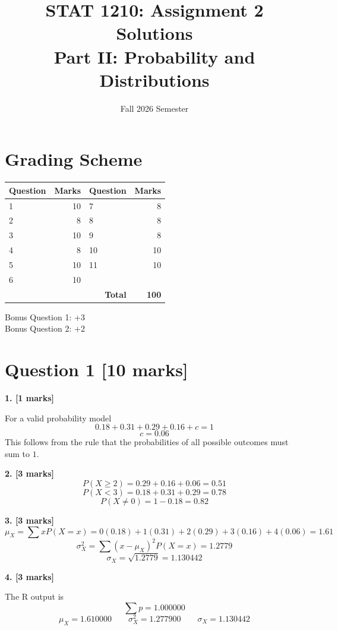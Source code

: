 \documentclass[10pt,letterpaper]{article}
\title{STAT 1210: Assignment 2 Solutions\\[4pt]\large Part II: Probability and Distributions}
\author{Fall 2026 Semester}
\date{}
\begin{document}
\maketitle

\section*{Grading Scheme}

\begin{center}
\begin{tabular}{lr@{\qquad}lr}
\toprule
Question & Marks & Question & Marks\\
\midrule
1 & 10 & 7 & 8\\
2 & 8 & 8 & 8\\
3 & 10 & 9 & 8\\
4 & 8 & 10 & 10\\
5 & 10 & 11 & 10\\
6 & 10 & &\\
\midrule
\multicolumn{3}{r}{\textbf{Total}} & \textbf{100}\\
\bottomrule
\end{tabular}
\end{center}

Bonus Question 1: +3 \\
Bonus Question 2: +2

\newpage

\section*{Question 1 \hfill [10 marks]}

\textbf{1. [1 marks]}

For a valid probability model
$$0.18+0.31+0.29+0.16+c=1$$
$$\boxed{c=0.06}$$
This follows from the rule that the probabilities of all possible outcomes must sum to \(1\).

\textbf{2. [3 marks]}
$$P(X\ge2)=0.29+0.16+0.06=\boxed{0.51}$$
$$P(X<3)=0.18+0.31+0.29=\boxed{0.78}$$
$$P(X\ne0)=1-0.18=\boxed{0.82}$$

\textbf{3. [3 marks]}
$$\mu_X=\sum xP(X=x)=0(0.18)+1(0.31)+2(0.29)+3(0.16)+4(0.06)=\boxed{1.61}$$
$$\sigma_X^2=\sum (x-\mu_X)^2P(X=x)=\boxed{1.2779}$$
$$\sigma_X=\sqrt{1.2779}=\boxed{1.130442}$$

\textbf{4. [3 marks]}

The R output is
$$\boxed{\sum p=1.000000}$$
$$\boxed{\mu_X=1.610000 \qquad \sigma_X^2=1.277900 \qquad \sigma_X=1.130442}$$
\end{document}
